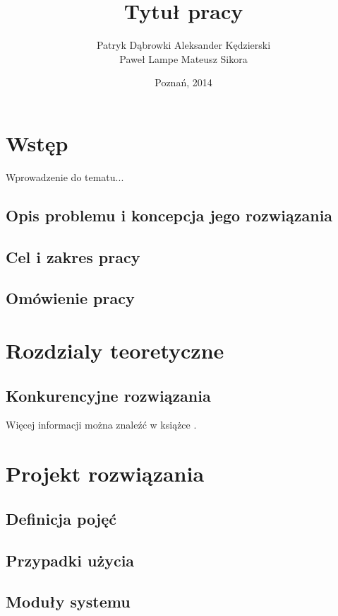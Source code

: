 \documentclass[11pt,a4paper,polish,thesis]{dcsbook}
\begin{document}
\author{Patryk Dąbrowki Aleksander Kędzierski\\ Paweł Lampe Mateusz Sikora}
\title{Tytuł pracy}
\date{Poznań, 2014}

\maketitle

\frontmatter

\tableofcontents{}

\mainmatter

\chapter{Wstęp}
Wprowadzenie do tematu...
\section{Opis problemu i koncepcja jego rozwiązania}
\section{Cel i zakres pracy}
\section{Omówienie pracy}

\chapter{Rozdzialy teoretyczne}
\section{Konkurencyjne rozwiązania}
Więcej informacji można znaleźć w książce \cite{sop}.

\chapter{Projekt rozwiązania}
\section{Definicja pojęć}
\section{Przypadki użycia}
\section{Moduły systemu}
\end{document}
